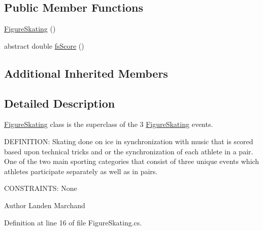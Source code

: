 \subsection*{Public Member Functions}
\begin{DoxyCompactItemize}
\item 
\hyperlink{classPCO_1_1FigureSkating_af988e41fae7e28d2b1a46c9c114726fd}{Figure\+Skating} ()
\item 
abstract double \hyperlink{classPCO_1_1FigureSkating_a5e2227ce9d5d0d49b295e48c7f43e88d}{fs\+Score} ()
\end{DoxyCompactItemize}
\subsection*{Additional Inherited Members}


\subsection{Detailed Description}
\hyperlink{classPCO_1_1FigureSkating}{Figure\+Skating} class is the superclass of the 3 \hyperlink{classPCO_1_1FigureSkating}{Figure\+Skating} events. 

D\+E\+F\+I\+N\+I\+T\+I\+O\+N\+: Skating done on ice in synchronization with music that is scored based upon technical tricks and or the synchronization of each athlete in a pair. One of the two main sporting categories that consist of three unique events which athletes participate separately as well as in pairs.

C\+O\+N\+S\+T\+R\+A\+I\+N\+T\+S\+: None\begin{DoxyAuthor}{Author}
Landen Marchand 
\end{DoxyAuthor}


Definition at line 16 of file Figure\+Skating.\+cs.



